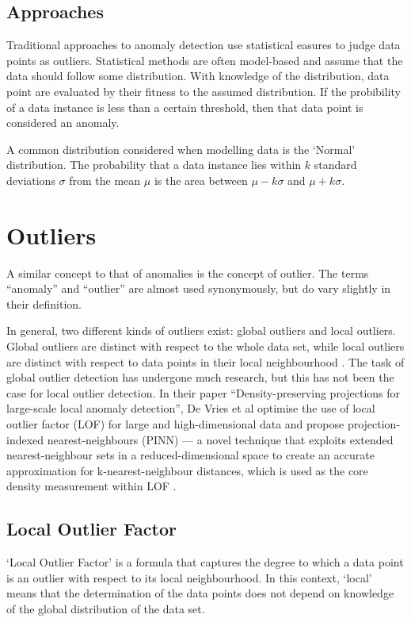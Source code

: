 \subsection{Approaches}
Traditional approaches to anomaly detection use statistical easures to judge 
data points as outliers. Statistical methods are often model-based and assume 
that the data should follow some distribution. With knowledge of the 
distribution, data point are evaluated by their fitness to the assumed 
distribution. If the probibility of a data instance is less than a certain 
threshold, then that data point is considered an anomaly.

A common distribution considered when modelling data is the `Normal' 
distribution. The probability that a data instance lies within $k$ standard 
deviations $\sigma$ from the mean $\mu$ is the area between $\mu - k\sigma$ and 
$\mu + k\sigma$.

\section{Outliers}
\label{sec:outliers}
A similar concept to that of anomalies is the concept of outlier. The terms 
``anomaly'' and ``outlier'' are almost used synonymously, but do vary slightly 
in their definition.

In general, two different kinds of outliers exist: global outliers and local 
outliers. Global outliers are distinct with respect to the whole data set, while
local outliers are distinct with respect to data points in their local 
neighbourhood \cite{Vries:2011}. The task of global outlier detection has 
undergone much research, but this has not been the case for local outlier 
detection. In their paper ``Density-preserving projections for large-scale local
anomaly detection'', De Vries et al optimise the use of local outlier factor 
(LOF) for large and high-dimensional data and propose projection-indexed 
nearest-neighbours (PINN) --- a novel technique that exploits extended 
nearest-neighbour sets in a reduced-dimensional space to create an accurate 
approximation for k-nearest-neighbour distances, which is used as the core 
density measurement within LOF \cite{Vries:2011}.

\subsection{Local Outlier Factor}
\label{sec:localOutlierFactor}
`Local Outlier Factor' is a formula that captures the degree to which a data 
point is an outlier with respect to its local neighbourhood. In this context,
`local' means that the determination of the data points does not depend on 
knowledge of the global distribution of the data set.

